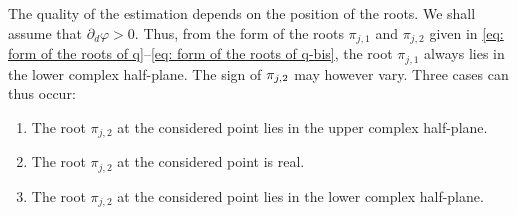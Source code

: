 \documentclass[JEP,XML,SOM,Unicode,published]{cedram}
\theoremstyle{plain}
\theoremstyle{definition}
\let \Im \relax
\DeclareMathOperator{\Im}{Im}
\begin{document}
The quality of the estimation depends on the
position of the roots. We shall assume that $\partial_d
\varphi >0$. Thus, from the form of the roots $\pi_{j,1}$
and $\pi_{j,2}$ given in \eqref{eq: form of the roots of q}--\eqref{eq: form of the
roots of q-bis},
the root $\pi_{j,1}$ always lies in the lower
complex half-plane. The sign of $\Im \pi_{j,2}$ may however vary.
Three cases can thus occur:
\begin{enumerate}
\item The root $\pi_{j,2}$ at the considered point lies in the upper complex half-plane.
\item The root $\pi_{j,2}$ at the considered point is real.
\item The root $\pi_{j,2}$ at the considered point lies in the lower complex half-plane.
\end{enumerate}
\end{document}
